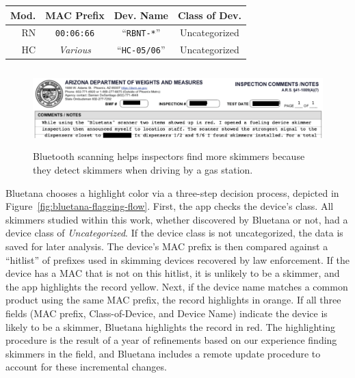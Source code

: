 \begin{center}
    \begin{tabular}{r|c|c|c}
        \textbf{Mod.} & \textbf{MAC Prefix} & \textbf{Dev. Name} & \textbf{Class of Dev.} \\ 
        \hline RN & \texttt{00:06:66} & ``\texttt{RBNT-*}'' & Uncategorized
				\\ HC & \textit{Various} & ``\texttt{HC-05/06}'' & Uncategorized \\
    \end{tabular}
\end{center}


%
%

\begin{figure}
    \centering
    \includegraphics[width=\textwidth,height=3cm]{skimmer/fig/arizona_driveby_anecdote.png}
    \caption{
    \label{fig:arizona_driveby}
 	Bluetooth scanning helps inspectors find more skimmers because they detect skimmers when driving by a gas station.
    }
\end{figure}

Bluetana chooses a highlight color via a three-step decision process, depicted in Figure~\ref{fig:bluetana-flagging-flow}.
%
First, the app checks the device's class.
%
All skimmers studied within this work, whether discovered by Bluetana or not, had a device class of \emph{Uncategorized}.
%
If the device class is not uncategorized, the data is saved for later analysis.
%
The device's MAC prefix is then compared against a ``hitlist'' of prefixes used in skimming devices recovered by law enforcement.
%
If the device has a MAC that is not on this hitlist, it is unlikely to be a skimmer, and the app highlights the record yellow.
%
Next, if the device name matches a common product using the same MAC prefix, the record highlights in orange.
%
If all three fields (MAC prefix, Class-of-Device, and Device Name) indicate the device is likely to be a skimmer, Bluetana highlights the record in red.
%
The highlighting procedure is the result of a year of refinements based on our experience finding skimmers in the field, and Bluetana includes a remote update procedure to account for these incremental changes.

